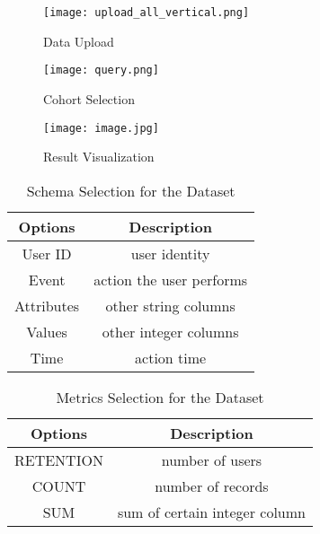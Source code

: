 

\begin{figure*}
\begin{minipage}{0.3\textwidth}
    \centering
    \texttt{[image: upload\_all\_vertical.png]}
    \caption{Data Upload}
    \label{fig:upload}
\end{minipage}
\begin{minipage}{0.38\textwidth}
    \texttt{[image: query.png]}
    \caption{Cohort Selection}
    \label{fig:cohort}
\end{minipage}
\begin{minipage}{0.3\textwidth}
    \texttt{[image: image.jpg]}
    \caption{Result Visualization}
    \label{fig:visual}
\end{minipage}

\end{figure*}

\begin{table}[tb!]
\begin{center}
    \begin{tabular}{ |c|c| }
        \hline
        Options & Description \\[0.5ex] 
        \hline\hline
        User ID & user identity \\
        \hline
        Event & action the user performs\\
        \hline
        Attributes & other string columns\\
        \hline
        Values & other integer columns\\
        \hline
        Time & action time \\
        \hline
    \end{tabular}
\end{center}
\caption{Schema Selection for the Dataset}
\label{table:schema}
\end{table}

\begin{table}[tb!]
\begin{center}
    \begin{tabular}{ | c | c | }
        \hline
        Options & Description \\[0.5ex] 
        \hline\hline
        RETENTION & number of users \\
        \hline
        COUNT & number of records \\
        \hline
        SUM & sum of certain integer column \\
        \hline
    \end{tabular}
\end{center}
\caption{Metrics Selection for the Dataset}
\label{table:metrics}
\end{table}

